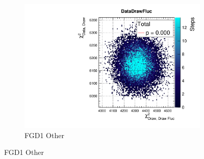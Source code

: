 \begin{figure}[h]
\begin{subfigure}[t]{0.32\textwidth}
		\includegraphics[width=\textwidth, trim={20mm 6mm 4mm 11mm}, clip,page=25]{figures/mach3/2018/data/2018a_FixedCov_RedCov_Mpi_Data_merge_PostPredStore_FullLLH_procs}
		\caption{FGD1 Other}
	\end{subfigure}
	

\end{figure}
